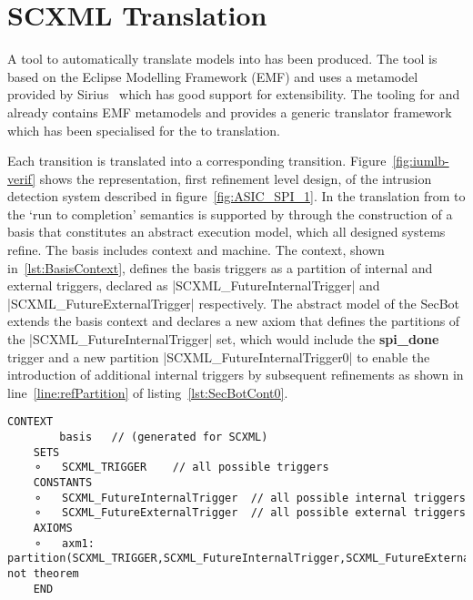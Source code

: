 \section{SCXML Translation}
\label{sec:translation}

A tool to automatically translate \SCXML models into \iUMLB has been produced. 
The tool is based on the Eclipse Modelling Framework (EMF) and uses a \SCXML metamodel provided by Sirius~\cite{siriuswebsite} which has good support for extensibility. 
The tooling for \iUMLB and \EventB already contains EMF metamodels and provides a generic translator framework which has been specialised for the \SCXML to \iUMLB translation. 

Each \SCXML transition is translated into a corresponding \iUMLB transition. 
Figure~\ref{fig:iumlb-verif} shows the \iUMLB representation, first refinement level design, of the intrusion detection system described in
figure~\ref{fig:ASIC_SPI_1}. 
In the translation from \iUMLB to \EventB the `run to completion' semantics is supported by \EventB through the construction of a basis that constitutes an abstract execution model, which all designed systems refine. 
The basis includes \EventB context and machine. 
The context, shown in~\ref{lst:BasisContext}, defines the basis triggers as a partition of internal and external triggers, declared as |SCXML_FutureInternalTrigger| and |SCXML_FutureExternalTrigger| respectively. 
The abstract model of the SecBot extends the basis context and declares a new axiom that defines the partitions of the |SCXML_FutureInternalTrigger| set, which would include the \textbf{spi\_done} trigger and a new partition |SCXML_FutureInternalTrigger0| to enable the introduction of additional internal triggers by subsequent refinements as shown in line~\ref{line:refPartition} of listing~\ref{lst:SecBotCont0}. 

\begin{lstlisting}[caption={Abstract basis context},label={lst:BasisContext}, language=Event-B, escapechar=|, frame=single]
	CONTEXT
		basis 	// (generated for SCXML)
	SETS
	⚬	SCXML_TRIGGER	 // all possible triggers
	CONSTANTS
	⚬	SCXML_FutureInternalTrigger	 // all possible internal triggers
	⚬	SCXML_FutureExternalTrigger	 // all possible external triggers  
	AXIOMS
	⚬	axm1:	partition(SCXML_TRIGGER,SCXML_FutureInternalTrigger,SCXML_FutureExternalTrigger) not theorem 
	END
\end{lstlisting}	

